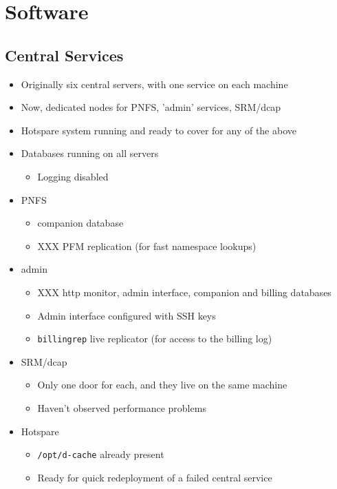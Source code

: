 \documentclass{beamer}
\begin{document}
\section{Software}
\subsection{Central Services}
\begin{frame}
\begin{itemize}
	\item Originally six central servers, with one service on each machine
	\item Now, dedicated nodes for PNFS, 'admin' services, SRM/dcap
	\item Hotspare system running and ready to cover for any of the above
	\item Databases running on all servers
	\begin{itemize}
		\item Logging disabled
	\end{itemize}
	\item PNFS
	\begin{itemize}
		\item companion database
		\item XXX PFM replication (for fast namespace lookups)
	\end{itemize}
	\item admin
	\begin{itemize}
		\item XXX http monitor, admin interface, companion and billing databases
		\item Admin interface configured with SSH keys
		\item {\tt billingrep} live replicator (for access to the billing log)
	\end{itemize}
	\item SRM/dcap
	\begin{itemize}
		\item Only one door for each, and they live on the same machine
		\item Haven't observed performance problems
	\end{itemize}
	\item Hotspare
	\begin{itemize}
		\item {\tt /opt/d-cache} already present
		\item Ready for quick redeployment of a failed central service
	\end{itemize}
\end{itemize}
\end{frame}
\end{document}
